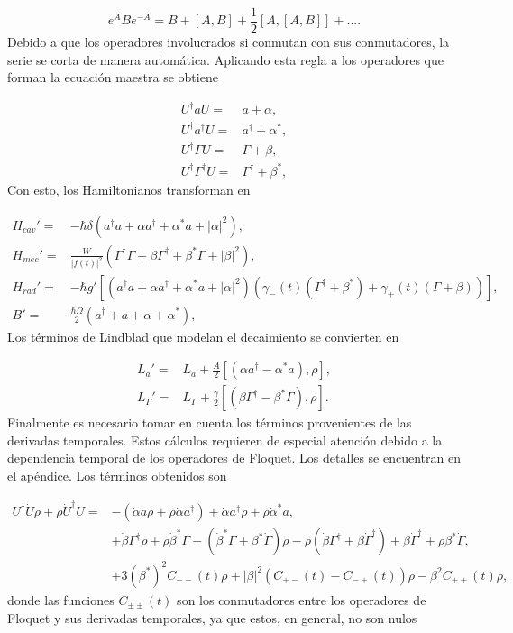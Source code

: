 \documentclass[a4paper,10pt]{report}
\begin{document}
\begin{equation}
e^{A} B e^{-A} = B + [A,B] + \frac{1}{2}[A,[A,B]] + ... .
\end{equation} Debido a que los operadores involucrados si conmutan con sus conmutadores, la serie se corta de manera automática. Aplicando esta regla a los operadores que forman la ecuación maestra se obtiene

\begin{align}
U^{\dagger} a U =& a + \alpha, \\
U^{\dagger} a^{\dagger} U =& a^{\dagger} + \alpha^*, \\
U^{\dagger} \Gamma U =& \Gamma + \beta, \\
U^{\dagger} \Gamma^{\dagger} U =& \Gamma^{\dagger} + \beta^*, 
\end{align} Con esto, los Hamiltonianos transforman en

\begin{align}
H_{cav}' =& -\hbar \delta(a^{\dagger}a +\alpha a^{\dagger}+\alpha^* a + |\alpha|^2),\\
H_{mec}' =& \frac{W}{|f(t)|^2}(\Gamma^{\dagger}\Gamma + \beta \Gamma^{\dagger} + \beta^* \Gamma + |\beta|^2 ),\\
H_{rad}'=&-\hbar g'[(a^{\dagger}a +\alpha a^{\dagger}+\alpha^* a + |\alpha|^2)(\gamma_-(t)(\Gamma^{\dagger}+\beta^*)+\gamma_+(t)(\Gamma+\beta))],\\
B' =& \frac{\hbar \Omega}{2}(a^{\dagger} + a +\alpha + \alpha^*),
\end{align}Los términos de Lindblad que modelan el decaimiento se convierten en

\begin{align}
L_a ' =& L_a + \frac{A}{2}[(\alpha a^\dagger - \alpha^*a),\rho], \\
L_{\Gamma}' =& L_{\Gamma} + \frac{\gamma}{2}[(\beta\Gamma^{\dagger}-\beta^* \Gamma),\rho].
\end{align}Finalmente es necesario tomar en cuenta los términos provenientes de las derivadas temporales. Estos cálculos requieren de especial atención debido a la dependencia temporal de los operadores de Floquet. Los detalles se encuentran en el apéndice. Los términos obtenidos son

\begin{align*}
U^{\dagger}\dot{U}\rho + \rho \dot{U}^\dagger U =& -(\dot{\alpha}a \rho + \rho\dot{\alpha}a^{\dagger}) + \dot{\alpha}a^{\dagger}\rho + \rho \dot{\alpha}^*a,\\
&+ \dot{\beta}\Gamma^{\dagger}\rho + \rho\dot{\beta}^*\Gamma-(\dot{\beta}^*\Gamma + \beta^*\dot{\Gamma})\rho - \rho(\dot{\beta} \Gamma^{\dagger} + \beta \dot{\Gamma}^{\dagger}) +\beta \dot{\Gamma}^{\dagger} + \rho\beta^* \dot{\Gamma},\\
&+3(\beta^*)^2C_{--}(t)\rho + |\beta|^2(C_{+-}(t) - C_{-+}(t))\rho -  \beta^2 C_{++}(t)\rho,
\end{align*}  donde las funciones $C_{\pm \pm}(t)$ son los conmutadores entre los operadores de Floquet y sus derivadas temporales, ya que estos, en general, no son nulos
\end{document}
